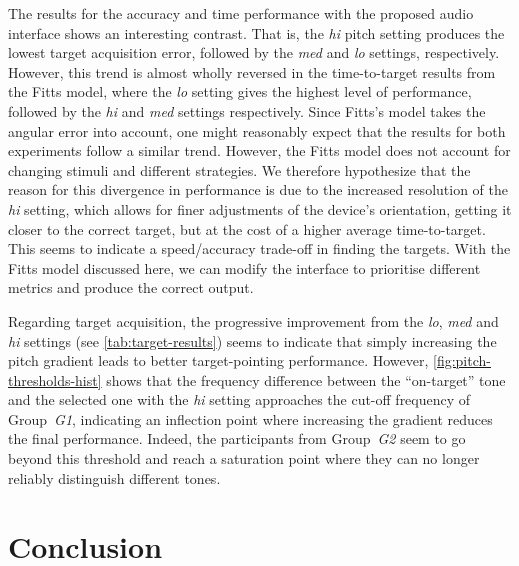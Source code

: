 \documentclass[acmsmall]{acmart}
\begin{document}
The results for the accuracy and time performance with the proposed audio interface shows an interesting contrast.
That is, the \textit{hi} pitch setting produces the lowest target acquisition error, followed by the \textit{med} and \textit{lo} settings, respectively. 
However, this trend is almost wholly reversed in the time-to-target results from the Fitts model, where the \textit{lo} setting gives the highest level of performance, followed by the \textit{hi} and \textit{med} settings respectively. 
Since Fitts's model takes the angular error into account, one might reasonably expect that the results for both experiments follow a similar trend. 
However, the Fitts model does not account for changing stimuli and different strategies.
We therefore hypothesize that the reason for this divergence in performance is due to the increased resolution of the \textit{hi} setting, which allows for finer adjustments of the device's orientation, getting it closer to the correct target, but at the cost of a higher average time-to-target. 
This seems to indicate a speed/accuracy trade-off in finding the targets.
With the Fitts model discussed here, we can modify the interface to prioritise different metrics and produce the correct output. 

Regarding target acquisition, the progressive improvement from the \textit{lo}, \textit{med} and \textit{hi} settings (see \cref{tab:target-results}) seems to indicate that simply increasing the pitch gradient leads to better target-pointing performance.
However, \cref{fig:pitch-thresholds-hist} shows that the frequency difference between the ``on-target'' tone and the selected one with the \textit{hi} setting approaches the cut-off frequency of Group~\textit{G1}, indicating an inflection point where increasing the gradient reduces the final performance. 
Indeed, the participants from Group~\textit{G2} seem to go beyond this threshold and reach a saturation point where they can no longer reliably distinguish different tones.  

\section{Conclusion}\label{sec:conclusion}
\end{document}
